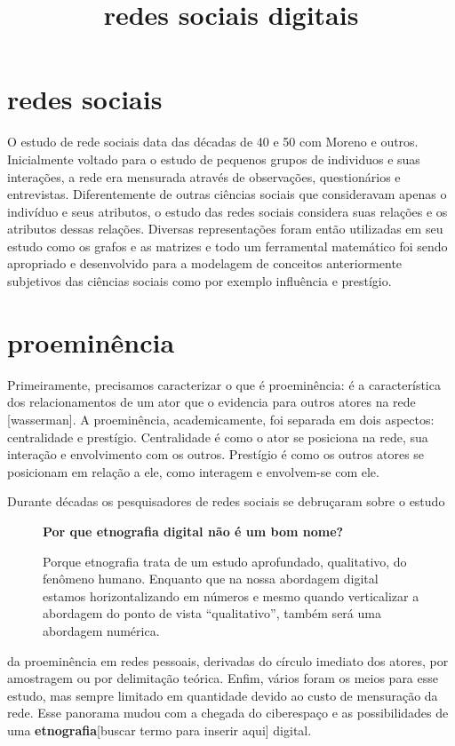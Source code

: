 \documentclass{article}
\begin{document}
\title{redes sociais digitais}

\section{redes sociais}

O estudo de rede sociais data das décadas de 40 e 50 com Moreno e outros.
Inicialmente voltado para o estudo de pequenos grupos de individuos e suas
interações, a rede era mensurada através de observações, questionários e
entrevistas. Diferentemente de outras ciências sociais que consideravam apenas o
indivíduo e seus atributos, o estudo das redes sociais considera suas relações
e os atributos dessas relações. Diversas representações foram então utilizadas
em seu estudo como os grafos e as matrizes e todo um ferramental matemático foi
sendo apropriado e desenvolvido para a modelagem de conceitos anteriormente
subjetivos das ciências sociais como por exemplo influência e prestígio. 

\section{proeminência}

Primeiramente, precisamos caracterizar o que é proeminência: é a característica
dos relacionamentos de um ator que o evidencia para outros atores na rede
[wasserman]. A proeminência, academicamente, foi separada em dois aspectos:
centralidade e prestígio. Centralidade é como o ator se posiciona na rede, sua
interação e envolvimento com os outros. Prestígio é como os outros atores se
posicionam em relação a ele, como interagem e envolvem-se com ele. 

Durante décadas os pesquisadores de redes sociais se debruçaram sobre o estudo
\begin{wrapfigure}{r}{2in}
\begin{boxedminipage}{2in}
\textbf{\large{Por que etnografia digital não é um bom nome?}}
\normalsize{}

Porque etnografia trata de um estudo aprofundado, qualitativo, do fenômeno
humano. Enquanto que na nossa abordagem digital estamos horizontalizando em
números e mesmo quando verticalizar a abordagem do ponto de vista
``qualitativo'', também será uma abordagem numérica.
\end{boxedminipage}
\end{wrapfigure} da proeminência em redes pessoais, derivadas do círculo
imediato dos atores, por amostragem ou por delimitação teórica. Enfim, vários foram os meios para esse
estudo, mas sempre limitado em quantidade devido ao custo de mensuração da rede.
Esse panorama mudou com a chegada do ciberespaço e as possibilidades de uma
\textbf{etnografia}[buscar termo para inserir aqui] digital. 
\end{document}
